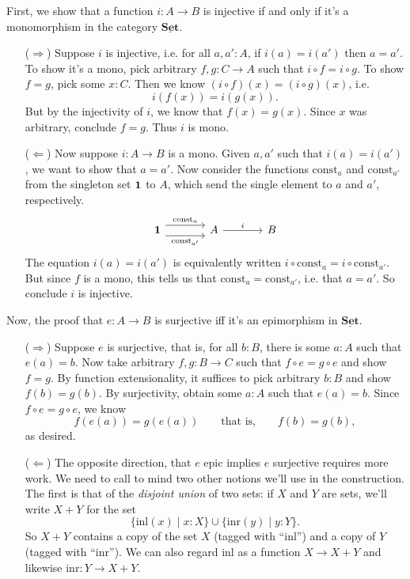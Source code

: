 \documentclass{article}
\newcommand{\Set}{\mathbf{Set}}
\newcommand{\cat}[1]{\underline{\mathbf{#1}}}
\newcommand{\inl}{\mathrm{inl}}
\newcommand{\inr}{\mathrm{inr}}
\newcommand{\const}[1][]{\mathrm{const}_{#1}}
\begin{document}
\begin{Answer}
  First, we show that a function $i\colon A\to B$ is injective if and only if it's a monomorphism in the category $\cat{\Set}$.
  \begin{enumerate}
    \item[($\Rightarrow$)] Suppose $i$ is injective, i.e. for all $a,a'\colon A$, if $i(a)=i(a')$ then $a=a'$. To show it's a mono, pick arbitrary $f,g\colon C\to A$ such that $i\circ f = i\circ g$. To show $f=g$, pick some $x\colon C$. Then we know $(i\circ f)(x)=(i\circ g)(x)$, i.e.
    \[ i(f(x)) = i(g(x)). \]
    But by the injectivity of $i$, we know that $f(x)=g(x)$. Since $x$ was arbitrary, conclude $f=g$. Thus $i$ is mono.
    \item[($\Leftarrow$)] Now suppose $i\colon A\to B$ is a mono. Given $a,a'$ such that $i(a)=i(a')$, we want to show that $a=a'$. Now consider the functions $\const[a]$ and $\const[a']$ from the singleton set $\bf{1}$ to $A$, which send the single element to $a$ and $a'$, respectively.
    \[ \begin{tikzcd}[column sep=large] \bf{1} \arrow[shift left=2]{r}{\const[a]} \arrow[swap,shift right=2]{r}{\const[a']} & A \arrow{r}{i} & B \end{tikzcd} \]
    The equation $i(a)=i(a')$ is equivalently written $i\circ\const[a]=i\circ\const[a']$. But since $f$ is a mono, this tells us that $\const[a]=\const[a']$, i.e. that $a=a'$. So conclude $i$ is injective.
  \end{enumerate}

  Now, the proof that $e\colon A \to B$ is surjective iff it's an epimorphism in $\cat{Set}$.
  \begin{enumerate}
    \item[($\Rightarrow$)] Suppose $e$ is surjective, that is, for all $b\colon B$, there is some $a\colon A$ such that $e(a)=b$. Now take arbitrary $f,g\colon B\to C$ such that $f\circ e=g\circ e$ and show $f=g$. By function extensionality, it suffices to pick arbitrary $b\colon B$ and show $f(b)=g(b)$. By surjectivity, obtain some $a\colon A$ such that $e(a)=b$. Since $f\circ e=g\circ e$, we know
    \[ f(e(a)) = g(e(a)) \qquad\text{that is,}\qquad f(b)=g(b),\]
    as desired.
    \item[($\Leftarrow$)] The opposite direction, that $e$ epic implies $e$ surjective requires more work. We need to call to mind two other notions we'll use in the construction. The first is that of the \emph{disjoint union} of two sets: if $X$ and $Y$ are sets, we'll write $X+Y$ for the set
    \[  \{\inl(x) \mid x\colon X\} \cup \{\inr(y)\mid y\colon Y\}. \]
    So $X+Y$ contains a copy of the set $X$ (tagged with ``$\inl$'') and a copy of $Y$ (tagged with ``$\inr$''). We can also regard $\inl$ as a function $X\to X+Y$ and likewise $\inr\colon Y\to X+Y$.
    

\end{enumerate}
\end{Answer}
\end{document}
